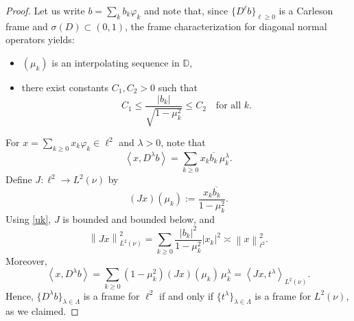 \documentclass[11pt]{amsart}
\theoremstyle{definition}
\theoremstyle{remark}
\numberwithin{equation}{section}
\def\phi{\varphi}
\newcommand{\norm}[1]{\left\|#1\right\|}
\newcommand{\ip}[2]{\left\langle #1,#2\right\rangle}
\begin{document}
\begin{proof}
Let us write $b=\sum_k b_k\phi_k$ and note that, since $\{D^\ell b\}_{\ell\ge 0}$ is a Carleson frame and $\sigma(D)\subset(0,1)$,
the frame characterization for diagonal normal operators yields:
\begin{itemize}
\item $(\mu_k)$ is an interpolating sequence in $\mathbb D$,
\item there exist constants $C_1,C_2>0$ such that
\begin{equation}\label{uk}
C_1 \le \frac{|b_k|}{\sqrt{1-\mu_k^2}} \le C_2
\quad\text{for all } k.
\end{equation}
\end{itemize}
For $x=\sum_{k\geq 0} x_k\phi_k\in\ell^2$ and $\lambda>0$, note that
\[
\ip{x}{D^\lambda b}
= \sum_{k\ge 0} x_k\overline{b_k}\,\mu_k^\lambda.
\]
Define $J:\ell^2\to L^2(\nu)$ by
\[
(Jx)(\mu_k) := \frac{x_k\overline{b_k}}{1-\mu_k^2}.
\]
Using \eqref{uk}, $J$ is bounded and bounded below, and
\[
\norm{Jx}_{L^2(\nu)}^2
= \sum_{k\geq 0} \frac{|b_k|^2}{1-\mu_k^2}|x_k|^2
\asymp \norm{x}_{\ell^2}^2.
\]
Moreover,
\[
\ip{x}{D^\lambda b}
= \sum_{k\geq 0} (1-\mu_k^2)(Jx)(\mu_k)\,\mu_k^\lambda
= \ip{Jx}{t^\lambda}_{L^2(\nu)}.
\]
Hence, $\{D^\lambda b\}_{\lambda\in\Lambda}$ is a frame for $\ell^2$ if and only if $\{t^\lambda\}_{\lambda\in\Lambda}$ is a frame for $L^2(\nu)$, as we claimed.
\end{proof}
\end{document}
